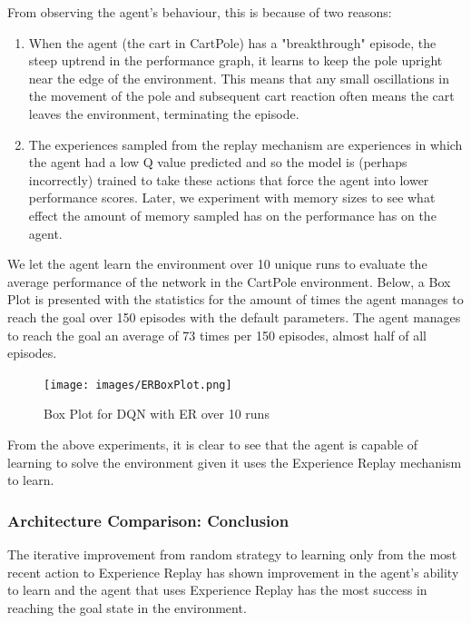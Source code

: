 \documentclass{article}
\begin{document}
From observing the agent's behaviour, this is because of two reasons:

\begin{enumerate}
    \item When the agent (the cart in CartPole) has a "breakthrough" episode, the steep uptrend in the performance graph, it learns to keep the pole upright near the edge of the environment. This means that any small oscillations in the movement of the pole and subsequent cart reaction often means the cart leaves the environment, terminating the episode.
    
    \item The experiences sampled from the replay mechanism are experiences in which the agent had a low Q value predicted and so the model is (perhaps incorrectly) trained to take these actions that force the agent into lower performance scores. Later, we experiment with memory sizes to see what effect the amount of memory sampled has on the performance has on the agent. 
    
\end{enumerate}

We let the agent learn the environment over 10 unique runs to evaluate the average performance of the network in the CartPole environment. Below, a Box Plot is presented with the statistics for the amount of times the agent manages to reach the goal over 150 episodes with the default parameters. The agent manages to reach the goal an average of 73 times per 150 episodes, almost half of all episodes. 

\begin{figure}[H]
    \centering
    \texttt{[image: images/ERBoxPlot.png]}
    \caption{Box Plot for DQN with ER over 10 runs}
    \label{fig:ER13}
\end{figure}



From the above experiments, it is clear to see that the agent is capable of learning to solve the environment given it uses the Experience Replay mechanism to learn.

\subsubsection{Architecture Comparison: Conclusion}

The iterative improvement from random strategy to learning only from the most recent action to Experience Replay has shown improvement in the agent's ability to learn and the agent that uses Experience Replay has the most success in reaching the goal state in the environment.
\end{document}
